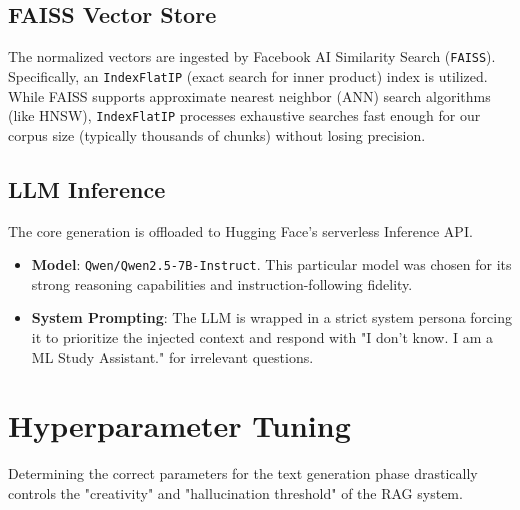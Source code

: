 \documentclass[12pt,a4paper]{article}
\begin{document}
\subsection{FAISS Vector Store}
The normalized vectors are ingested by Facebook AI Similarity Search (\texttt{FAISS}). Specifically, an \texttt{IndexFlatIP} (exact search for inner product) index is utilized. While FAISS supports approximate nearest neighbor (ANN) search algorithms (like HNSW), \texttt{IndexFlatIP} processes exhaustive searches fast enough for our corpus size (typically thousands of chunks) without losing precision.

\subsection{LLM Inference}
The core generation is offloaded to Hugging Face's serverless Inference API. 
\begin{itemize}
    \item \textbf{Model}: \texttt{Qwen/Qwen2.5-7B-Instruct}. This particular model was chosen for its strong reasoning capabilities and instruction-following fidelity.
    \item \textbf{System Prompting}: The LLM is wrapped in a strict system persona forcing it to prioritize the injected context and respond with "I don't know. I am a ML Study Assistant." for irrelevant questions.
\end{itemize}

\section{Hyperparameter Tuning}
Determining the correct parameters for the text generation phase drastically controls the "creativity" and "hallucination threshold" of the RAG system.
\end{document}
